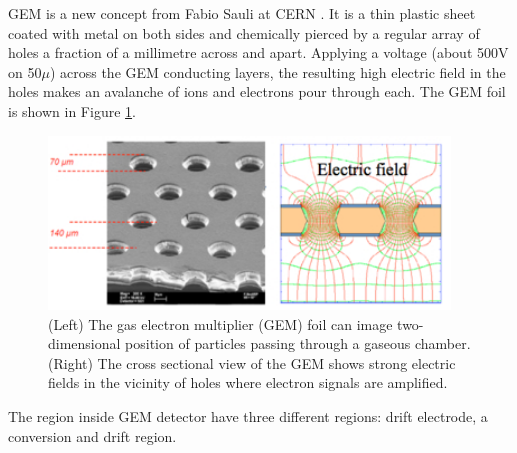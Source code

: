 GEM is a new concept from Fabio Sauli at CERN \cite{Sauli1997}.
It is a thin plastic sheet coated with metal on both sides and chemically pierced by a regular array of holes a fraction of a millimetre across and apart. 
Applying a voltage (about 500V on 50$\mu$) across the GEM conducting layers, the resulting high electric field in the holes makes an avalanche of ions and electrons pour through each. 
The GEM foil is shown in Figure \ref{fig:gem}.
\begin{figure}[!htbp]
	\centering
	\includegraphics[width=0.95\textwidth]{figures/GEM/KEKDTP3.jpg}
	\caption{(Left) The gas electron multiplier (GEM) foil can image two-dimensional position of particles passing through a gaseous chamber. (Right) The cross sectional view of the GEM shows strong electric fields in the vicinity of holes where electron signals are amplified.}
	\label{fig:gem}
\end{figure}
The region inside GEM detector have three different regions: drift electrode, a conversion and drift region.

